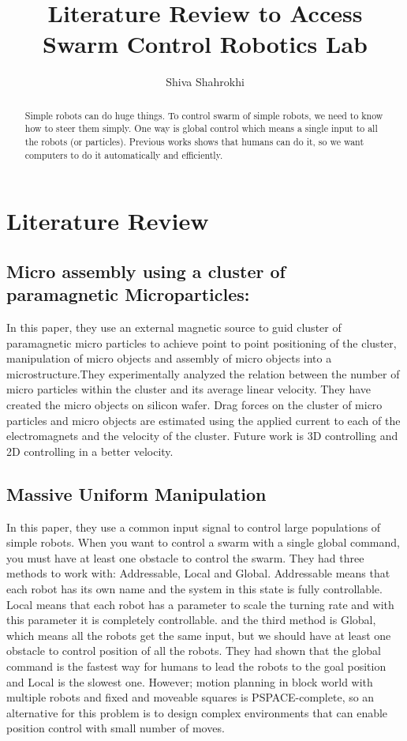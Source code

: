 \documentclass[letterpaper, 10 pt, conference]{ieeeconf}
\begin{document}
\author{Shiva Shahrokhi}
\title{Literature Review to Access Swarm Control Robotics Lab}
\maketitle

\begin{abstract}

Simple robots can do huge things. To control swarm of simple robots, we need to know how to steer them simply. One way is global control which means a single input to all the robots (or particles). Previous works shows that humans can do it, so we want computers to do it automatically and efficiently.
 
\end{abstract}

\section{Literature Review}
\subsection{Micro assembly using a cluster of paramagnetic Microparticles:}

In this paper, they use an external magnetic source to guid cluster of paramagnetic micro particles to achieve point to point positioning of the cluster, manipulation of micro objects and assembly of micro objects into a microstructure.They experimentally analyzed the relation between the number of micro particles within the cluster and its average linear velocity. They have created the micro objects on silicon wafer. Drag forces on the cluster of micro particles and micro objects are estimated using the applied current to each of the electromagnets and the velocity of the cluster. Future work is 3D controlling and 2D controlling in a better velocity.\cite{Khalil2013}

\subsection{Massive Uniform Manipulation}

In this paper, they use a common input signal to control large populations of simple robots. When you want to control a swarm with a single global command, you must have at least one obstacle to control the swarm. They had three methods to work with: Addressable, Local and Global. Addressable means that each robot has its own name and the system in this state is fully controllable. Local means that each robot has a parameter to scale the turning rate and with this parameter it is completely controllable. and the third method is Global, which means all the robots get the same input, but we should have at least one obstacle to control position of all the robots. They had shown that the global command is the fastest way for humans to lead the robots to the goal position and Local is the slowest one. However; motion planning in block world with multiple robots and fixed and moveable squares is PSPACE-complete, so an alternative for this problem is to design complex environments that can enable position control with small number of moves. \cite{AaronManipulation2013}
\end{document}
